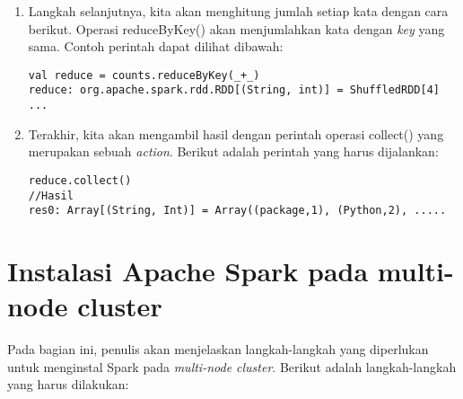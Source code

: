 \begin{enumerate}
\item Langkah selanjutnya, kita akan menghitung jumlah setiap kata dengan cara berikut. Operasi reduceByKey() akan menjumlahkan kata dengan \textit{key} yang sama. Contoh perintah dapat dilihat dibawah:  

\begin{verbatim}
val reduce = counts.reduceByKey(_+_)
reduce: org.apache.spark.rdd.RDD[(String, int)] = ShuffledRDD[4] ...
\end{verbatim}

\item Terakhir, kita akan mengambil hasil dengan perintah operasi collect() yang merupakan sebuah \textit{action}. Berikut adalah perintah yang harus dijalankan:

\begin{verbatim}
reduce.collect()
//Hasil
res0: Array[(String, Int)] = Array((package,1), (Python,2), .....
\end{verbatim}

\end{enumerate}

\section{Instalasi Apache Spark pada multi-node cluster}

Pada bagian ini, penulis akan menjelaskan langkah-langkah yang diperlukan untuk menginstal Spark pada\textit{ multi-node cluster}. Berikut adalah langkah-langkah yang harus dilakukan:

